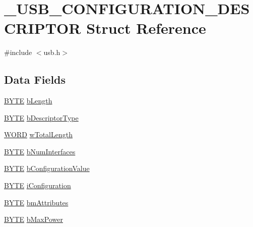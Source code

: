 \hypertarget{struct___u_s_b___c_o_n_f_i_g_u_r_a_t_i_o_n___d_e_s_c_r_i_p_t_o_r}{
\section{\_\-USB\_\-CONFIGURATION\_\-DESCRIPTOR Struct Reference}
\label{struct___u_s_b___c_o_n_f_i_g_u_r_a_t_i_o_n___d_e_s_c_r_i_p_t_o_r}
}


{\ttfamily \#include $<$usb.h$>$}

\subsection*{Data Fields}
\begin{DoxyCompactItemize}
\item 
\hyperlink{type_8h_a4ae1dab0fb4b072a66584546209e7d58}{BYTE} \hyperlink{struct___u_s_b___c_o_n_f_i_g_u_r_a_t_i_o_n___d_e_s_c_r_i_p_t_o_r_a8e443464272fdf3bd5148df0b7f5dcaf}{bLength}
\item 
\hyperlink{type_8h_a4ae1dab0fb4b072a66584546209e7d58}{BYTE} \hyperlink{struct___u_s_b___c_o_n_f_i_g_u_r_a_t_i_o_n___d_e_s_c_r_i_p_t_o_r_ac1d02ce6fe165032044fb81602a9b07c}{bDescriptorType}
\item 
\hyperlink{type_8h_a197942eefa7db30960ae396d68339b97}{WORD} \hyperlink{struct___u_s_b___c_o_n_f_i_g_u_r_a_t_i_o_n___d_e_s_c_r_i_p_t_o_r_a7b85867f4bc8a9a8a39791d85ae89fc8}{wTotalLength}
\item 
\hyperlink{type_8h_a4ae1dab0fb4b072a66584546209e7d58}{BYTE} \hyperlink{struct___u_s_b___c_o_n_f_i_g_u_r_a_t_i_o_n___d_e_s_c_r_i_p_t_o_r_a12ba216beafb7194adae869dfaef2a7e}{bNumInterfaces}
\item 
\hyperlink{type_8h_a4ae1dab0fb4b072a66584546209e7d58}{BYTE} \hyperlink{struct___u_s_b___c_o_n_f_i_g_u_r_a_t_i_o_n___d_e_s_c_r_i_p_t_o_r_a33c99e7d8c3f8dbabda4dc28898118f8}{bConfigurationValue}
\item 
\hyperlink{type_8h_a4ae1dab0fb4b072a66584546209e7d58}{BYTE} \hyperlink{struct___u_s_b___c_o_n_f_i_g_u_r_a_t_i_o_n___d_e_s_c_r_i_p_t_o_r_aa504ab29f030455396dec5b99591de6f}{iConfiguration}
\item 
\hyperlink{type_8h_a4ae1dab0fb4b072a66584546209e7d58}{BYTE} \hyperlink{struct___u_s_b___c_o_n_f_i_g_u_r_a_t_i_o_n___d_e_s_c_r_i_p_t_o_r_a5ca38633eddd8c1c055694e5c2c5e566}{bmAttributes}
\item 
\hyperlink{type_8h_a4ae1dab0fb4b072a66584546209e7d58}{BYTE} \hyperlink{struct___u_s_b___c_o_n_f_i_g_u_r_a_t_i_o_n___d_e_s_c_r_i_p_t_o_r_a5662d2b9b0e5ef2290c7ae87b85b60a2}{bMaxPower}
\end{DoxyCompactItemize}


